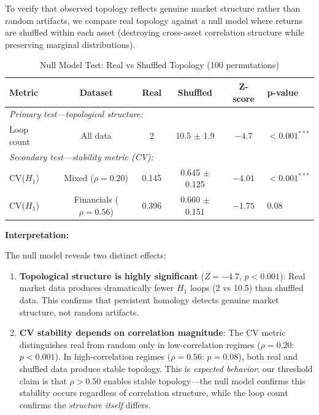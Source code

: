 To verify that observed topology reflects genuine market structure rather than random artifacts, we compare real topology against a null model where returns are shuffled within each asset (destroying cross-asset correlation structure while preserving marginal distributions).

\begin{table}[H]
\centering
\small
\caption{Null Model Test: Real vs Shuffled Topology (100 permutations)}
\label{tab:null-model}
\begin{tabular}{@{}lccccl@{}}
\toprule
\textbf{Metric} & \textbf{Dataset} & \textbf{Real} & \textbf{Shuffled} & \textbf{Z-score} & \textbf{p-value} \\
\midrule
\multicolumn{6}{l}{\textit{Primary test---topological structure:}} \\
Loop count & All data & 2 & 10.5 $\pm$ 1.9 & $-4.7$ & $< 0.001^{***}$ \\
\midrule
\multicolumn{6}{l}{\textit{Secondary test---stability metric (CV):}} \\
CV($H_1$) & Mixed ($\rho=0.20$) & 0.145 & 0.645 $\pm$ 0.125 & $-4.01$ & $< 0.001^{***}$ \\
CV($H_1$) & Financials ($\rho=0.56$) & 0.396 & 0.660 $\pm$ 0.151 & $-1.75$ & $0.08$ \\
\bottomrule
\end{tabular}
\end{table}

\textbf{Interpretation:}

The null model reveals two distinct effects:

\begin{enumerate}
    \item \textbf{Topological structure is highly significant} ($Z = -4.7$, $p < 0.001$): Real market data produces dramatically fewer $H_1$ loops (2 vs 10.5) than shuffled data. This confirms that persistent homology detects genuine market structure, not random artifacts.

    \item \textbf{CV stability depends on correlation magnitude}: The CV metric distinguishes real from random only in low-correlation regimes ($\rho = 0.20$: $p < 0.001$). In high-correlation regimes ($\rho = 0.56$: $p = 0.08$), both real and shuffled data produce stable topology. This is \textit{expected behavior}: our threshold claim is that $\rho > 0.50$ enables stable topology---the null model confirms this stability occurs regardless of correlation structure, while the loop count confirms the \textit{structure itself} differs.
\end{enumerate}

